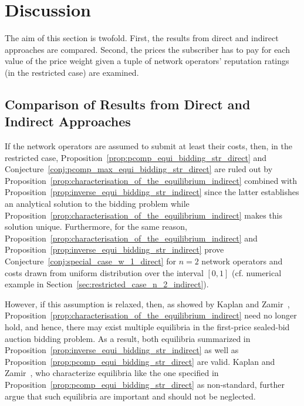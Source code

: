 \section{Discussion} %
\label{sec:discussion_indirect}
The aim of this section is twofold. First, the results from direct and indirect approaches are compared. Second, the prices the subscriber has to pay for each value of the price weight given a tuple of network operators' reputation ratings (in the restricted case) are examined.

\subsection{Comparison of Results from Direct and Indirect Approaches} %
\label{sub:comparison_of_results_from_direct_and_indirect_approaches_indirect}
If the network operators are assumed to submit at least their costs, then, in the restricted case, Proposition~\ref{prop:pcomp_equi_bidding_str_direct} and Conjecture~\ref{conj:pcomp_max_equi_bidding_str_direct} are ruled out by Proposition~\ref{prop:characterisation_of_the_equilibrium_indirect} combined with Proposition~\ref{prop:inverse_equi_bidding_str_indirect} since the latter establishes an analytical solution to the bidding problem while Proposition~\ref{prop:characterisation_of_the_equilibrium_indirect} makes this solution unique. Furthermore, for the same reason, Proposition~\ref{prop:characterisation_of_the_equilibrium_indirect} and Proposition~\ref{prop:inverse_equi_bidding_str_indirect} prove Conjecture~\ref{conj:special_case_w_1_direct} for $n=2$ network operators and costs drawn from uniform distribution over the interval $[0,1]$ (cf. numerical example in Section~\ref{sec:restricted_case_n_2_indirect}).

However, if this assumption is relaxed, then, as showed by Kaplan and Zamir~\cite{KaplanZamir2011}, Proposition~\ref{prop:characterisation_of_the_equilibrium_indirect} need no longer hold, and hence, there may exist multiple equilibria in the first-price sealed-bid auction bidding problem. As a result, both equilibria summarized in Proposition~\ref{prop:inverse_equi_bidding_str_indirect} as well as Proposition~\ref{prop:pcomp_equi_bidding_str_direct} are valid. Kaplan and Zamir~\cite{KaplanZamir2011}, who characterize equilibria like the one specified in Proposition~\ref{prop:pcomp_equi_bidding_str_direct} as non-standard, further argue that such equilibria are important and should not be neglected.

